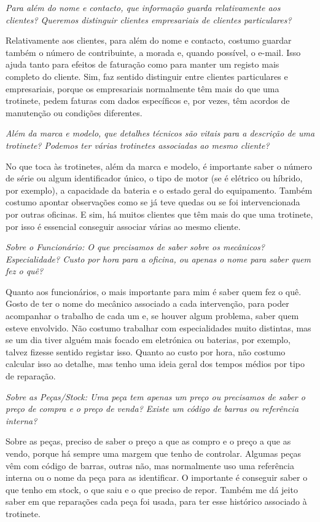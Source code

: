 \documentclass[11pt,a4paper]{article}
\newcommand{\pergunta}[1]{\item[P:] \textit{#1}}
\newcommand{\resposta}[1]{\item[R:] #1}
\begin{document}
	\begin{transcription}
		
		\pergunta{Para além do nome e contacto, que informação guarda relativamente aos clientes? Queremos distinguir clientes empresariais de clientes particulares?}
		\resposta{Relativamente aos clientes, para além do nome e contacto, costumo guardar também o número de contribuinte, a morada e, quando possível, o e-mail. Isso ajuda tanto para efeitos de faturação como para manter um registo mais completo do cliente. Sim, faz sentido distinguir entre clientes particulares e empresariais, porque os empresariais normalmente têm mais do que uma trotinete, pedem faturas com dados específicos e, por vezes, têm acordos de manutenção ou condições diferentes.}
		
		\pergunta{Além da marca e modelo, que detalhes técnicos são vitais para a descrição de uma trotinete? Podemos ter várias trotinetes associadas ao mesmo cliente?}
		\resposta{No que toca às trotinetes, além da marca e modelo, é importante saber o número de série ou algum identificador único, o tipo de motor (se é elétrico ou híbrido, por exemplo), a capacidade da bateria e o estado geral do equipamento. Também costumo apontar observações como se já teve quedas ou se foi intervencionada por outras oficinas. E sim, há muitos clientes que têm mais do que uma trotinete, por isso é essencial conseguir associar várias ao mesmo cliente.}
		
		\pergunta{Sobre o Funcionário: O que precisamos de saber sobre os mecânicos? Especialidade? Custo por hora para a oficina, ou apenas o nome para saber quem fez o quê?}
		\resposta{Quanto aos funcionários, o mais importante para mim é saber quem fez o quê. Gosto de ter o nome do mecânico associado a cada intervenção, para poder acompanhar o trabalho de cada um e, se houver algum problema, saber quem esteve envolvido. Não costumo trabalhar com especialidades muito distintas, mas se um dia tiver alguém mais focado em eletrónica ou baterias, por exemplo, talvez fizesse sentido registar isso. Quanto ao custo por hora, não costumo calcular isso ao detalhe, mas tenho uma ideia geral dos tempos médios por tipo de reparação.}
		
		\pergunta{Sobre as Peças/Stock: Uma peça tem apenas um preço ou precisamos de saber o preço de compra e o preço de venda? Existe um código de barras ou referência interna?}
		\resposta{Sobre as peças, preciso de saber o preço a que as compro e o preço a que as vendo, porque há sempre uma margem que tenho de controlar. Algumas peças vêm com código de barras, outras não, mas normalmente uso uma referência interna ou o nome da peça para as identificar. O importante é conseguir saber o que tenho em stock, o que saiu e o que preciso de repor. Também me dá jeito saber em que reparações cada peça foi usada, para ter esse histórico associado à trotinete.}
		

\end{transcription}
\end{document}
